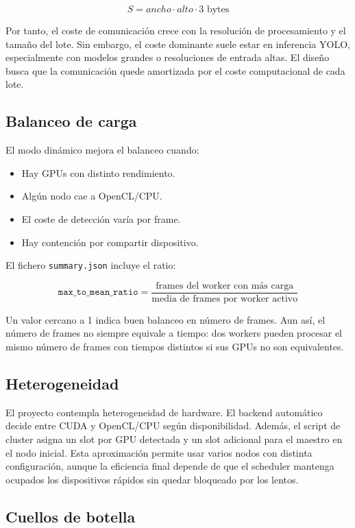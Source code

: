 \documentclass[12pt,a4paper]{article}
\begin{document}
\[
    S = ancho \cdot alto \cdot 3 \text{ bytes}
\]

Por tanto, el coste de comunicaci\'on crece con la resoluci\'on de procesamiento y el tama\~no
del lote. Sin embargo, el coste dominante suele estar en inferencia YOLO, especialmente con
modelos grandes o resoluciones de entrada altas. El dise\~no busca que la comunicaci\'on quede
amortizada por el coste computacional de cada lote.

\subsection{Balanceo de carga}

El modo din\'amico mejora el balanceo cuando:

\begin{itemize}
    \item Hay GPUs con distinto rendimiento.
    \item Alg\'un nodo cae a OpenCL/CPU.
    \item El coste de detecci\'on var\'ia por frame.
    \item Hay contenci\'on por compartir dispositivo.
\end{itemize}

El fichero \texttt{summary.json} incluye el ratio:

\[
    \texttt{max\_to\_mean\_ratio} =
    \frac{\text{frames del worker con m\'as carga}}
         {\text{media de frames por worker activo}}
\]

Un valor cercano a 1 indica buen balanceo en n\'umero de frames. Aun as\'i, el n\'umero de
frames no siempre equivale a tiempo: dos workers pueden procesar el mismo n\'umero de frames
con tiempos distintos si sus GPUs no son equivalentes.

\subsection{Heterogeneidad}

El proyecto contempla heterogeneidad de hardware. El backend autom\'atico decide entre CUDA y
OpenCL/CPU seg\'un disponibilidad. Adem\'as, el script de cluster asigna un slot por GPU
detectada y un slot adicional para el maestro en el nodo inicial. Esta aproximaci\'on permite
usar varios nodos con distinta configuraci\'on, aunque la eficiencia final depende de que el
scheduler mantenga ocupados los dispositivos r\'apidos sin quedar bloqueado por los lentos.

\subsection{Cuellos de botella}
\end{document}
